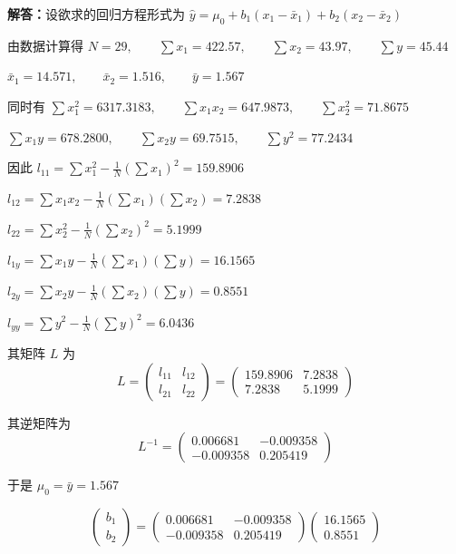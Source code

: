 \documentclass[UTF8,zihao=-4]{ctexart}
\newcommand{\jieda}{\noindent\textbf{解答：}}
\begin{document}
\jieda 设欲求的回归方程形式为 $\hat{y} = \mu_0+b_1(x_1-\bar{x}_1)+b_2(x_2-\bar{x}_2)$

由数据计算得 $N=29, \qquad \sum x_1=422.57, \qquad \sum x_2=43.97, \qquad \sum y=45.44$

$\bar{x}_1=14.571, \qquad \bar{x}_2=1.516, \qquad \bar{y}=1.567$

同时有 $\sum x_1^2=6317.3183, \qquad \sum x_1x_2=647.9873, \qquad \sum x_2^2=71.8675$

$\sum x_1y=678.2800, \qquad \sum x_2y=69.7515, \qquad \sum y^2=77.2434$

因此 $l_{11} = \sum x_1^2-\frac{1}{N}\left(\sum x_1\right)^2 = 159.8906$

$l_{12} = \sum x_1x_2-\frac{1}{N}\left(\sum x_1\right)\left(\sum x_2\right) = 7.2838$

$l_{22} = \sum x_2^2-\frac{1}{N}\left(\sum x_2\right)^2 = 5.1999$

$l_{1y} = \sum x_1y-\frac{1}{N}\left(\sum x_1\right)\left(\sum y\right) = 16.1565$

$l_{2y} = \sum x_2y-\frac{1}{N}\left(\sum x_2\right)\left(\sum y\right) = 0.8551$

$l_{yy} = \sum y^2-\frac{1}{N}\left(\sum y\right)^2 = 6.0436$

其矩阵 $L$ 为
\begin{equation*}
L=
    \begin{pmatrix}
        l_{11} & l_{12}\\
        l_{21} & l_{22}
    \end{pmatrix}
    =
    \begin{pmatrix}
        159.8906 & 7.2838\\
        7.2838 & 5.1999
    \end{pmatrix}
\end{equation*}

其逆矩阵为
\begin{equation*}
L^{-1}
    =
    \begin{pmatrix}
        0.006681 & -0.009358\\
        -0.009358 & 0.205419
    \end{pmatrix}
\end{equation*}

于是 $\mu_0=\bar{y}=1.567$

\begin{equation*}
\begin{pmatrix}
        b_1\\
        b_2
    \end{pmatrix}
    =
    \begin{pmatrix}
        0.006681 & -0.009358\\
        -0.009358 & 0.205419
    \end{pmatrix}
    \begin{pmatrix}
        16.1565\\
        0.8551
    \end{pmatrix}
\end{equation*}
\end{document}
